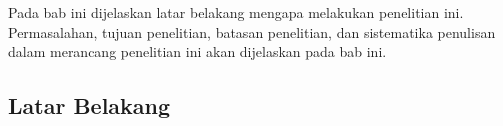 \chapter{\babSatu}
Pada bab ini dijelaskan latar belakang mengapa \saya melakukan penelitian ini. Permasalahan, tujuan penelitian, batasan penelitian, dan sistematika penulisan dalam merancang penelitian ini akan dijelaskan pada bab ini.

\section{Latar Belakang}

